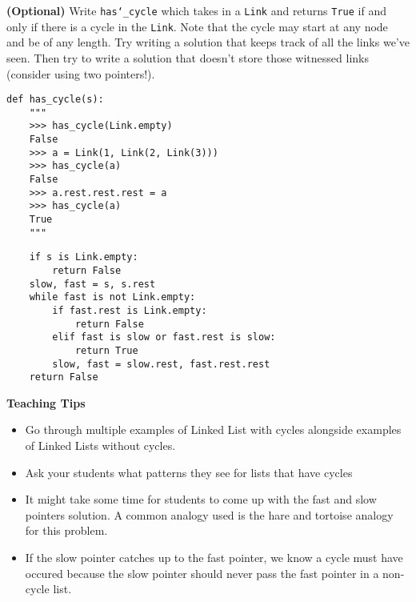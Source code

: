 \begin{blocksection}
\question \textbf{(Optional)} Write \texttt{has\char`_cycle} which takes in a
\texttt{Link} and returns \texttt{True} if and only if there is a cycle in the
\texttt{Link}. Note that the cycle may start at any node and be of any length.
Try writing a solution that keeps track of all the links we've seen. Then try to
write a solution that doesn't store those witnessed links (consider using
two pointers!).

\begin{lstlisting}
def has_cycle(s):
    """
    >>> has_cycle(Link.empty)
    False
    >>> a = Link(1, Link(2, Link(3)))
    >>> has_cycle(a)
    False
    >>> a.rest.rest.rest = a
    >>> has_cycle(a)
    True
    """
\end{lstlisting}

\begin{solution}
\begin{lstlisting}
    if s is Link.empty:
        return False
    slow, fast = s, s.rest
    while fast is not Link.empty:
        if fast.rest is Link.empty:
            return False
        elif fast is slow or fast.rest is slow:
            return True
        slow, fast = slow.rest, fast.rest.rest
    return False
\end{lstlisting}
\end{solution}

\begin{guide}
    \textbf{Teaching Tips}
    \begin{itemize}
       \item Go through multiple examples of Linked List with cycles alongside examples of Linked Lists without cycles.
       \item Ask your students what patterns they see for lists that have cycles
       \item It might take some time for students to come up with the fast and slow pointers solution. A common analogy used is the hare and tortoise analogy for this problem.
       \item If the slow pointer catches up to the fast pointer, we know a cycle must have occured because the slow pointer should never pass the fast pointer in a non-cycle list.
    \end{itemize}
 \end{guide}

\end{blocksection}